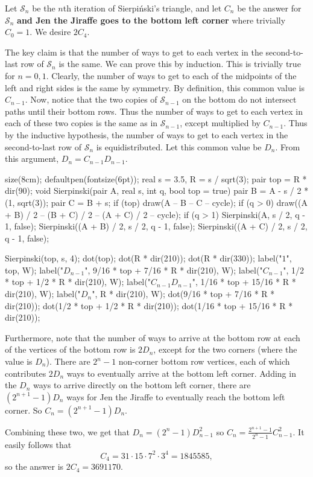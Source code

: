 Let $\mathcal{S}_n$ be the $n$th iteration of Sierpi\'nski's triangle, and let $C_n$ be the answer for $\mathcal{S}_n$ \textbf{and Jen the Jiraffe goes to the bottom left corner} where trivially $C_0=1$. We desire $2C_4$.
	
	The key claim is that the number of ways to get to each vertex in the second-to-last row of $\mathcal{S}_n$ is the same. We can prove this by induction. This is trivially true for $n=0,1$. Clearly, the number of ways to get to each of the midpoints of the left and right sides is the same by symmetry. By definition, this common value is $C_{n-1}$. Now, notice that the two copies of $\mathcal{S}_{n-1}$ on the bottom do not intersect paths until their bottom rows. Thus the number of ways to get to each vertex in each of these two copies is the same as in $\mathcal{S}_{n-1}$, except multiplied by $C_{n-1}$. Thus by the inductive hypothesis, the number of ways to get to each vertex in the second-to-last row of $\mathcal{S}_n$ is equidistributed. Let this common value be $D_n$. From this argument, $D_n=C_{n-1}D_{n-1}$.
	\begin{center}
		\begin{asy}
			size(8cm);
			defaultpen(fontsize(6pt));
			real s = 3.5, R = s / sqrt(3);
			pair top = R * dir(90);
			void Sierpinski(pair A, real s, int q, bool top = true) {
				pair B = A - s / 2 * (1, sqrt(3));
				pair C = B + s;
				if (top) draw(A -- B -- C -- cycle);
				if (q > 0) draw((A + B) / 2 -- (B + C) / 2 -- (A + C) / 2 -- cycle);
				if (q > 1) {
					Sierpinski(A, s / 2, q - 1, false);
					Sierpinski((A + B) / 2, s / 2, q - 1, false);
					Sierpinski((A + C) / 2, s / 2, q - 1, false);
				}
			}
			
			Sierpinski(top, s, 4);
			dot(top); dot(R * dir(210)); dot(R * dir(330));
			label("$1$", top, W);
			label("$D_{n-1}$", 9/16 * top + 7/16 * R * dir(210), W);
			label("$C_{n-1}$", 1/2 * top + 1/2 * R * dir(210), W);
			label("$C_{n-1}D_{n-1}$", 1/16 * top + 15/16 * R * dir(210), W);
			label("$D_n$", R * dir(210), W);
			dot(9/16 * top + 7/16 * R * dir(210)); dot(1/2 * top + 1/2 * R * dir(210)); dot(1/16 * top + 15/16 * R * dir(210));
		\end{asy}
	\end{center}
	Furthermore, note that the number of ways to arrive at the bottom row at each of the vertices of the bottom row is $2D_n$, except for the two corners (where the value is $D_n$). There are $2^n-1$ non-corner bottom row vertices, each of which contributes $2D_n$ ways to eventually arrive at the bottom left corner. Adding in the $D_n$ ways to arrive directly on the bottom left corner, there are $(2^{n+1}-1)D_n$ ways for Jen the Jiraffe to eventually reach the bottom left corner. So $C_n=(2^{n+1}-1)D_n$.
	
	Combining these two, we get that $D_n=(2^n-1)D_{n-1}^2$ so $C_n=\frac{2^{n+1}-1}{2^n-1}C_{n-1}^2$. It easily follows that
	\[
		C_4=31\cdot15\cdot7^2\cdot3^4=1845585,
	\]
	so the answer is $2C_4=3691170$.
	
